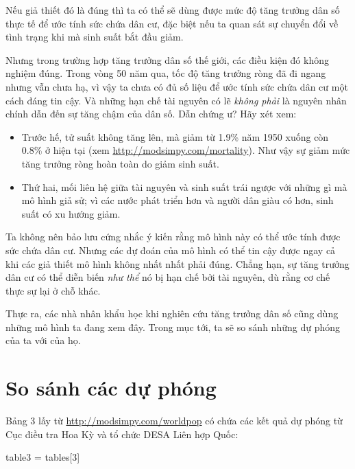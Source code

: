 \documentclass[12pt]{book}
\theoremstyle{exercise}
\begin{document}

Nếu giả thiết đó là đúng thì ta có thể sẽ dùng được mức độ tăng trưởng dân số thực tế để ước tính sức chứa dân cư, đặc biệt nếu ta quan sát sự chuyển đổi về tình trạng khi mà sinh suất bắt đầu giảm.

Nhưng trong trường hợp tăng trưởng dân số thế giới, các điều kiện đó không nghiệm đúng. Trong vòng 50 năm qua, tốc độ tăng trưởng ròng đã đi ngang nhưng vẫn chưa hạ, vì vậy ta chưa có đủ số liệu để ước tính sức chứa dân cư một cách đáng tin cậy. Và những hạn chế tài nguyên có lẽ {\em không phải} là nguyên nhân chính dẫn đến sự tăng chậm của dân số. Dẫn chứng ư? Hãy xét xem:

\begin{itemize}

\item Trước hế, tử suất không tăng lên, mà giảm từ 1.9\% năm 1950 xuống còn 0.8\% ở hiện tại (xem \url{http://modsimpy.com/mortality}).  Như vậy sự giảm mức tăng trưởng ròng hoàn toàn do giảm sinh suất.


\item Thứ hai, mối liên hệ giữa tài nguyên và sinh suất trái ngược với những gì mà mô hình giả sử; vì các nước phát triển hơn và người dân giàu có hơn, sinh suất có xu hướng giảm.


\end{itemize} 

Ta không nên bảo lưu cứng nhắc ý kiến rằng mô hình này có thể ước tính được sức chứa dân cư. Nhưng các dự đoán của mô hình có thể tin cậy được ngay cả khi các giả thiết mô hình không nhất nhất phải đúng. Chẳng hạn, sự tăng trưởng dân cư có thể diễn biến {\em như thể} nó bị hạn chế bởi tài nguyên, dù rằng cơ chế thực sự lại ở chỗ khác.

Thực ra, các nhà nhân khẩu học khi nghiên cứu tăng trưởng dân số cũng dùng những mô hình ta đang xem đây. Trong mục tới, ta sẽ so sánh những dự phóng của ta với của họ.


\section{So sánh các dự phóng}

Bảng 3 lấy từ \url{http://modsimpy.com/worldpop} có chứa các kết quả dự phóng từ Cục điều tra Hoa Kỳ và tổ chức DESA Liên hợp Quốc:

\begin{python}
table3 = tables[3]
\end{python}
\end{document}

